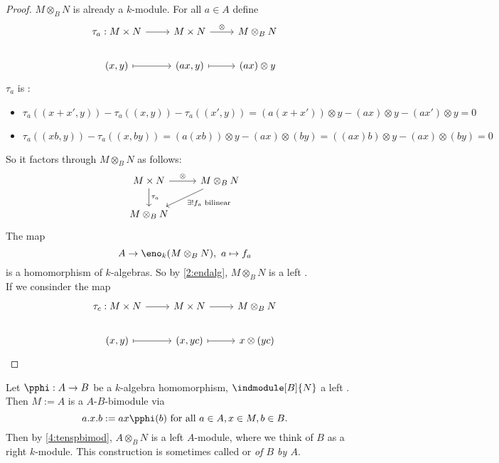 \begin{proof}
  $M\otimes_BN$ is already a $k$-module. For all $a\in A$ define
  \[
  \begin{tikzcd}
    \tau_a:M\times N\ar{r}&M\times N\ar{r}{\otimes}&M\otimes_B N\\
    (x,y)\ar[mapsto]{r}&(ax,y)\ar[mapsto]{r}&(ax)\otimes y
  \end{tikzcd}
  \]
  $\tau_a$ is :
  \begin{itemize}
     \item $\tau_a((x+x',y))-\tau_a((x,y))-\tau_a((x',y))= (a(x+x'))\otimes y - (ax)\otimes y - (ax')\otimes y =0$
     \item $\tau_a((xb,y))-\tau_a((x,by))=(a(xb))\otimes y -(ax)\otimes(by)=((ax)b)\otimes y - (ax)\otimes (by)= 0$
  \end{itemize}
So it factors through $M\otimes_BN$ as follows:
\[
\begin{tikzcd}
  M\times N\ar{d}{\tau_a} \ar{r}{\otimes}&M\otimes_B N\ar{dl}{\exists!f_a\text{ bilinear}}\\
  M\otimes_B N
\end{tikzcd}
\]
The map
\[
A\to \eno_k(M\otimes_BN),~a\mapsto f_a
\]
is a homomorphism of $k$-algebras. So by \cref{2:endalg}, $M\otimes_BN$ is a left .\\ If we consinder the map
\[
\begin{tikzcd}
  \tau_c:M\times N\ar{r}&M\times N\ar{r}&M\otimes_BN\\
  (x,y)\ar[mapsto]{r}&(x,yc)\ar[mapsto]{r}&x\otimes(yc)
\end{tikzcd}
\]
\end{proof}
\begin{rem}
  Let $\pphi:A\to B$ be a $k$-algebra homomorphism, $\indmodule[B]{N}$ a left . Then $M:=A$ is a $A$-$B$-bimodule via
  \[
  a.x.b:=ax\pphi(b)~\text{for all }a\in A,x\in M,b\in B.
  \]
  Then by \cref{4:tenspbimod}, $A\otimes_BN$ is a left $A$-module, where we think of $B$ as a right $k$-module. This construction is sometimes called  or  \emph{of $B$ by $A$}.
\end{rem}

